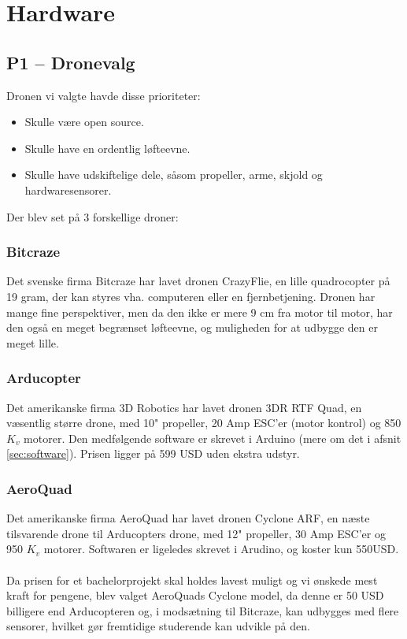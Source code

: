 \documentclass[Main]{subfiles}
\begin{document}
\chapter{Hardware}


\section[Dronevalg]{P1 -- Dronevalg}
Dronen vi valgte havde disse prioriteter:
\begin{itemize}
\item Skulle være open source.
\item Skulle have en ordentlig løfteevne.
\item Skulle have udskiftelige dele, såsom propeller, arme, skjold og hardwaresensorer.
\end{itemize}

Der blev set på 3 forskellige droner:
\subsection{Bitcraze}
Det svenske firma Bitcraze har lavet dronen CrazyFlie\cite{BitCraze}, en lille quadrocopter på 19 gram, der kan styres vha. computeren eller en fjernbetjening.
Dronen har mange fine perspektiver, men da den ikke er mere 9 cm fra motor til motor, har den også en meget begrænset løfteevne, og muligheden for at udbygge den er meget lille.

\subsection{Arducopter}
Det amerikanske firma 3D Robotics har lavet dronen 3DR RTF Quad\cite{ArduCopter}, en væsentlig større drone, med 10" propeller, 20 Amp ESC'er (motor kontrol) og 850 $K_v$\cite{Kv} motorer.
Den medfølgende software er skrevet i Arduino (mere om det i afsnit \ref{sec:software}). 
Prisen ligger på 599 USD uden ekstra udstyr.

\subsection{AeroQuad}
Det amerikanske firma AeroQuad har lavet dronen Cyclone ARF\cite{AQ-store}, en næste tilsvarende drone til Arducopters drone, med 12" propeller, 30 Amp ESC'er og 950 $K_v$\cite{Kv} motorer.
Softwaren er ligeledes skrevet i Arudino, og koster kun 550USD.
\\
\\
Da prisen for et bachelorprojekt skal holdes lavest muligt og vi ønskede mest kraft for pengene, blev valget AeroQuads Cyclone model, da denne er 50 USD billigere end Arducopteren og, i modsætning til Bitcraze, kan udbygges med flere sensorer, hvilket gør fremtidige studerende kan udvikle på den.
\end{document}
